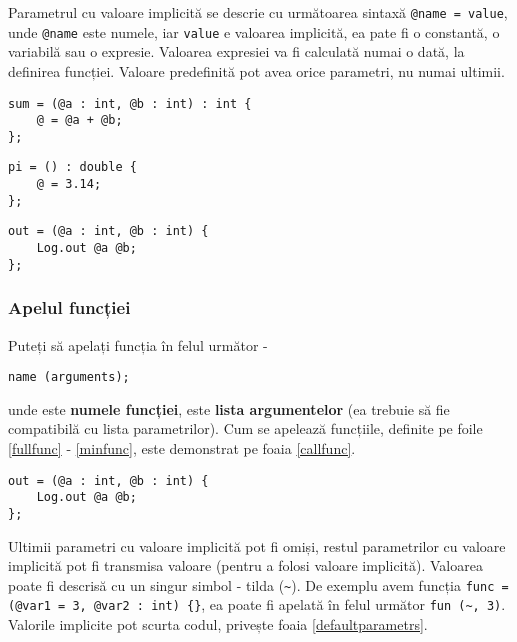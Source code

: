 Parametrul cu valoare implicită se descrie cu următoarea sintaxă \lstinline|@name = value|, unde \lstinline|@name| este numele, iar \lstinline|value| e valoarea implicită, ea pate fi o constantă, o variabilă sau o expresie. Valoarea expresiei va fi calculată numai o dată, la definirea funcției. Valoare predefinită pot avea orice parametri, nu numai ultimii.

\begin{lstlisting}[caption=Funcție completă, label=fullfunc]
sum = (@a : int, @b : int) : int {
	@ = @a + @b;
};
\end{lstlisting}

\begin{lstlisting}[caption=Funcție fără argumente, label=noargsfunc]
pi = () : double {
	@ = 3.14;
};
\end{lstlisting}

\begin{lstlisting}[caption=Funcție făra tip de date, label=notypefunc]
out = (@a : int, @b : int) {
	Log.out @a @b;
};
\end{lstlisting}

\subsubsection{Apelul funcției}

Puteți să apelați funcția în felul următor -
\begin{lstlisting}[numbers=none]
name (arguments);
\end{lstlisting}
unde  este {\bf numele funcției},  este {\bf lista argumentelor} (ea trebuie să fie compatibilă cu lista parametrilor). Cum se apelează funcțiile, definite pe foile \ref{fullfunc} - \ref{minfunc}, este demonstrat pe foaia \ref{callfunc}.

\begin{lstlisting}[caption=Funcție fără argumente și tip de date, label=minfunc]
out = (@a : int, @b : int) {
	Log.out @a @b;
};
\end{lstlisting}

Ultimii parametri cu valoare implicită pot fi omiși, restul parametrilor cu valoare implicită pot fi transmisa valoare \void{} (pentru a folosi valoare implicită). Valoarea \void{} poate fi descrisă cu un singur simbol - tilda (\lstinline|~|). De exemplu avem funcția \lstinline|func = (@var1 = 3, @var2 : int) {}|, ea poate fi apelată în felul următor \lstinline|fun (~, 3)|. Valorile implicite pot scurta codul, privește foaia \ref{defaultparametrs}.

